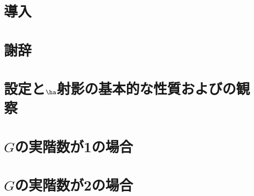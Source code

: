 \documentclass[12pt,dvipdfmx,uplatex]{jsarticle}
\begin{document}


\newgeometry{}

\makeatletter

\renewcommand*{\l@section}[2]{%
  \ifnum \c@tocdepth >\z@
    \addpenalty{\@secpenalty}%
    \addvspace{1.0em \@plus\p@}%
    \begingroup
      \parindent\z@
      \rightskip\@tocrmarg
      \parfillskip-\rightskip
      \leavevmode\headfont
      \setlength\@lnumwidth{1.5em}%
      \advance\leftskip\@lnumwidth \hskip-\leftskip
      #1\nobreak
      \leaders\hbox{\normalfont$\m@th \mkern \@dotsep mu\hbox{.}\mkern \@dotsep mu$}\hfill %
      \nobreak\hbox to\@pnumwidth{\hss#2}\par
    \endgroup
  \fi}

\makeatother


\setcounter{tocdepth}{3}
\tableofcontents

\allowdisplaybreaks[0]

\clearpage

\section*{導入}


\section*{謝辞}

% 

\clearpage

\section{設定と$\ha$射影の基本的な性質およびの観察}



\section{$G$の実階数が1の場合}




\section{$G$の実階数が2の場合}

\begin{thebibliography}{99}
  
\end{thebibliography}
\end{document}
